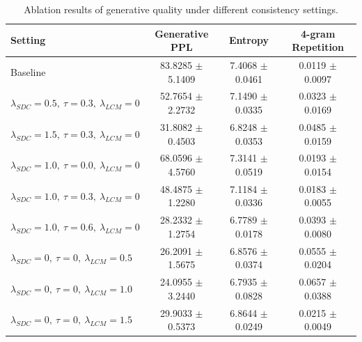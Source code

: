 \begin{table}[!htbp]
    \centering
    \caption{Ablation results of generative quality under different consistency settings.}
    \label{tab:ablation_generation}
    \small
    \begin{tabular}{lccc}
        \toprule[1.25pt]
        Setting
        & Generative PPL
        & Entropy
        & 4-gram Repetition \\
        \midrule

        Baseline
        & 83.8285 $\pm$ 5.1409
        & 7.4068 $\pm$ 0.0461
        & 0.0119 $\pm$ 0.0097 \\

        $\lambda_{SDC}=0.5,\ \tau=0.3,\ \lambda_{LCM}=0$
        & 52.7654 $\pm$ 2.2732
        & 7.1490 $\pm$ 0.0335
        & 0.0323 $\pm$ 0.0169 \\

        $\lambda_{SDC}=1.5,\ \tau=0.3,\ \lambda_{LCM}=0$
        & 31.8082 $\pm$ 0.4503
        & 6.8248 $\pm$ 0.0353
        & 0.0485 $\pm$ 0.0159 \\

        \midrule

        $\lambda_{SDC}=1.0,\ \tau=0.0,\ \lambda_{LCM}=0$
        & 68.0596 $\pm$ 4.5760
        & 7.3141 $\pm$ 0.0519
        & 0.0193 $\pm$ 0.0154 \\

        $\lambda_{SDC}=1.0,\ \tau=0.3,\ \lambda_{LCM}=0$
        & 48.4875 $\pm$ 1.2280
        & 7.1184 $\pm$ 0.0336
        & 0.0183 $\pm$ 0.0055 \\

        $\lambda_{SDC}=1.0,\ \tau=0.6,\ \lambda_{LCM}=0$
        & 28.2332 $\pm$ 1.2754
        & 6.7789 $\pm$ 0.0178
        & 0.0393 $\pm$ 0.0080 \\

        \midrule

        $\lambda_{SDC}=0,\ \tau=0,\ \lambda_{LCM}=0.5$
        & 26.2091 $\pm$ 1.5675
        & 6.8576 $\pm$ 0.0374
        & 0.0555 $\pm$ 0.0204 \\

        $\lambda_{SDC}=0,\ \tau=0,\ \lambda_{LCM}=1.0$
        & 24.0955 $\pm$ 3.2440
        & 6.7935 $\pm$ 0.0828
        & 0.0657 $\pm$ 0.0388 \\

        $\lambda_{SDC}=0,\ \tau=0,\ \lambda_{LCM}=1.5$
        & 29.9033 $\pm$ 0.5373
        & 6.8644 $\pm$ 0.0249
        & 0.0215 $\pm$ 0.0049 \\


\end{tabular}
\end{table}
